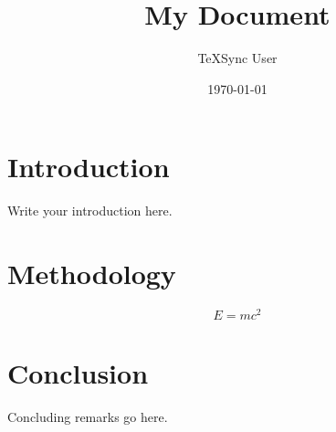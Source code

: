 \documentclass{article}
\title{My Document}
\author{TeXSync User}
\date{\today}
\begin{document}
\maketitle

\section{Introduction}
Write your introduction here.

\section{Methodology}
$$E = mc^2$$

\section{Conclusion}
Concluding remarks go here.
\end{document}
